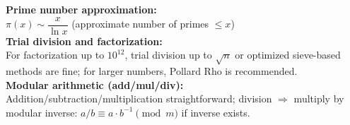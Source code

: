 \textbf{Prime number approximation:} \\[1mm]
$\pi(x)\sim \dfrac{x}{\ln x}$ (approximate number of primes $\le x$) \\

\textbf{Trial division and factorization:} \\[1mm]
For factorization up to $10^{12}$, trial division up to $\sqrt{n}$ or optimized sieve-based methods are fine; for larger numbers, Pollard Rho is recommended. \\

\textbf{Modular arithmetic (add/mul/div):} \\[1mm]
Addition/subtraction/multiplication straightforward; division $\Rightarrow$ multiply by modular inverse: $a/b \equiv a\cdot b^{-1} \pmod m$ if inverse exists. \\

